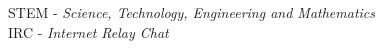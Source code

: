 STEM	- \textit{Science, Technology, Engineering and Mathematics}\\
IRC		- \textit{Internet Relay Chat}\\

